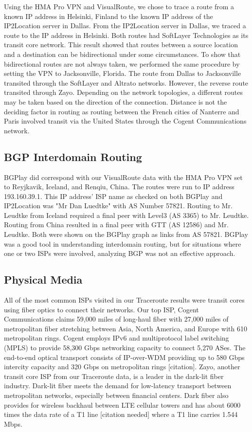 \documentclass{sigcomm-alternate}
\begin{document}
Using the HMA Pro VPN and VisualRoute, we chose to trace a route from a known IP address in Helsinki, Finland to the known IP address of the IP2Location server in Dallas. From the IP2Location server in Dallas, we traced a route to the IP address in Helsinki. Both routes had SoftLayer Technologies as its transit core network. This result showed that routes between a source location and a destination can be bidirectional under some circumstances. 
To show that bidirectional routes are not always taken, we performed the same procedure by setting the VPN to Jacksonville, Florida. The route from Dallas to Jacksonville transited through the SoftLayer and Altrato networks. However, the reverse route transited through Zayo. Depending on the network topologies, a different routes may be taken based on the direction of the connection. Distance is not the deciding factor in routing as routing between the French cities of Nanterre and Paris involved transit via the United States through the Cogent Communications network.
\subsection{BGP Interdomain Routing}

BGPlay did correspond with our VisualRoute data with the HMA Pro VPN set to Reyjkavik, Iceland, and Renqiu, China. The routes were run to IP address 193.160.39.1. This IP address' ISP name as checked on both BGPlay and IP2Location was "Mr Dan Luedtke" with AS Number 57821. Routing to Mr. Leudtke from Iceland required a final peer with Level3 (AS 3365) to Mr. Leudtke. Routing from China resulted in a final peer with GTT (AS 12586) and Mr. Leudtke. Both were shown on the BGPlay graph as links from AS 57821. BGPlay was a good tool in understanding interdomain routing, but for situations where one or two ISPs were involved, analyzing BGP was not an effective approach.

\subsection{Physical Media}


All of the most common ISPs visited in our Traceroute results were transit cores using fiber optics to connect their networks. Our top ISP, Cogent Communications claims 59,000 miles of long-haul fiber with 27,000 miles of metropolitan fiber stretching between Asia, North America, and Europe with 610 metropolitan rings. Cogent employs IPv6 and multiprotocol label switching (MPLS) to provide 58,300 Gbps networking capacity to connect 5,270 ASes.  The end-to-end optical transport consists of IP-over-WDM providing up to 580 Gbps intercity capacity and 320 Gbps on metropolitan rings [citation]. Zayo, another transit core ISP from our Traceroute data, is a leader in the dark-lit fiber industry. Dark-lit fiber meets the demand for low-latency transport between metropolitan networks, especially between financial centers. Dark fiber also provides for wireless backhaul between LTE cellular towers and has about 6000 times the data rate of a T1 line [citation needed] where a T1 line carries 1.544 Mbps. 
\end{document}

